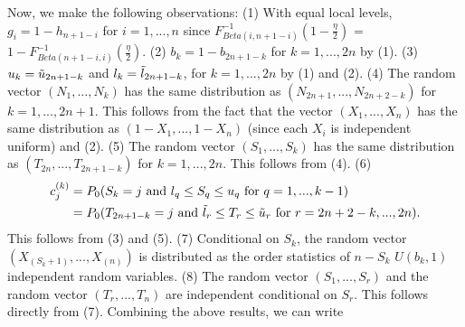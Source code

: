\documentclass[article]{jss}
\begin{document}
%
Now, we make the following observations:
\newline
\newline
(1) With equal local levels, $g_{i} = 1 - h_{n + 1 - i}$ for $i = 1, ..., n$ since $F_{Beta(i, n + 1 - i)}^{-1}(1 - \frac{\eta}{2})$ = $1 - F_{Beta(n + 1 - i, i)}^{-1}(\frac{\eta}{2})$.
\newline
\newline
(2) $b_{k} = 1 - b_{2n + 1 - k}$ for $k = 1, ..., 2n$ by (1). 
\newline
\newline
(3) $u_{k} = \Tilde{u}_{2n + 1 - k}$ and $l_{k} = \Tilde{l}_{2n + 1 - k}$, for $k = 1,..., 2n$ by (1) and (2).
\newline
\newline
(4) The random vector $(N_{1}, ..., N_{k})$ has the same distribution as $(N_{2n + 1}, ..., N_{2n+2-k})$ for $k = 1, ..., 2n + 1$. This follows from the fact that the vector $(X_{1}, ..., X_{n})$ has the same distribution as $(1 - X_{1}, ..., 1 - X_{n})$ (since each $X_{i}$ is independent uniform) and (2).
\newline
\newline
(5) The random vector $(S_{1}, ..., S_{k})$ has the same distribution as $(T_{2n}, ..., T_{2n + 1 - k})$ for $k = 1, ..., 2n$. This follows from (4). 
\newline
\newline
(6)
%
\begin{align*}
    c_{j}^{(k)} &= P_{0}(S_{k} = j \textrm{ and } l_{q} \leq S_{q} \leq u_{q} \textrm{ for } q = 1, ..., k - 1)\\
    &= P_{0}(T_{2n + 1 - k} = j \textrm{ and } \Tilde{l}_{r} \leq T_{r} \leq \Tilde{u}_{r} \textrm{ for } r = 2n + 2 - k, ..., 2n).\\
\end{align*}
%
This follows from (3) and (5). 
\newline
\newline
(7) Conditional on $S_{k}$, the random vector $(X_{(S_{k} + 1)}, ..., X_{(n)})$ is distributed as the order statistics of $n - S_{k}$ $U(b_{k}, 1)$ independent random variables.
\newline
\newline
(8) The random vector $(S_{1}, ..., S_{r})$ and the random vector $(T_{r}, ..., T_{n})$ are independent conditional on $S_{r}$. This follows directly from (7).
\newline
\newline
Combining the above results, we can write
\end{document}
